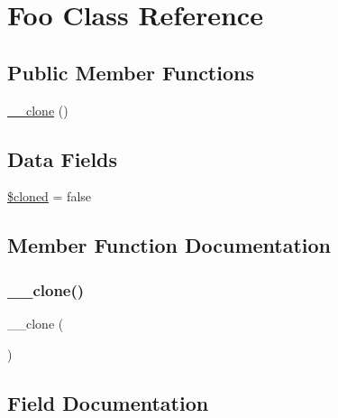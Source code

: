 \hypertarget{class_deep_copy_1_1f005_1_1_foo}{}\section{Foo Class Reference}
\label{class_deep_copy_1_1f005_1_1_foo}
\subsection*{Public Member Functions}
\begin{DoxyCompactItemize}
\item 
\mbox{\hyperlink{class_deep_copy_1_1f005_1_1_foo_ad0cb87b388bc74d63dc884accdca8713}{\+\_\+\+\_\+clone}} ()
\end{DoxyCompactItemize}
\subsection*{Data Fields}
\begin{DoxyCompactItemize}
\item 
\mbox{\hyperlink{class_deep_copy_1_1f005_1_1_foo_adde823dfad7d62fbfb51f60b16dcb8d6}{\$cloned}} = false
\end{DoxyCompactItemize}


\subsection{Member Function Documentation}
\mbox{\label{class_deep_copy_1_1f005_1_1_foo_ad0cb87b388bc74d63dc884accdca8713}} 
\subsubsection{\texorpdfstring{\+\_\+\+\_\+clone()}{\_\_clone()}}
{\footnotesize\ttfamily \+\_\+\+\_\+clone (\begin{DoxyParamCaption}{ }\end{DoxyParamCaption})}



\subsection{Field Documentation}
\mbox{\label{class_deep_copy_1_1f005_1_1_foo_adde823dfad7d62fbfb51f60b16dcb8d6}} 
